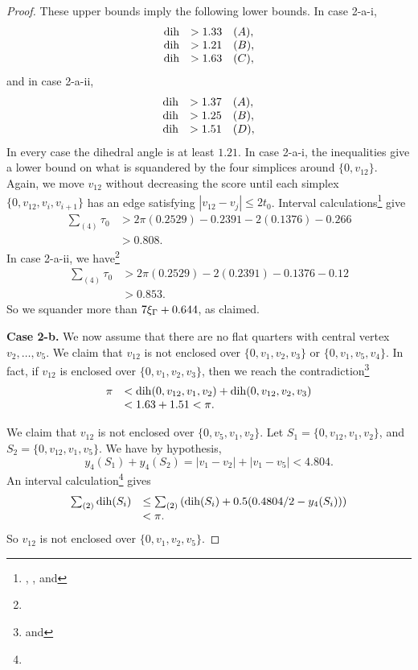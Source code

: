 \begin{proof}
These upper bounds imply the following lower bounds.  In case
2-a-i,
$$
\begin{array}{lll}
\operatorname{dih} &> 1.33 \quad(A),\\
\operatorname{dih} &> 1.21 \quad(B),\\
\operatorname{dih} &> 1.63 \quad(C),\\
\end{array}
$$
and in case 2-a-ii,
$$
\begin{array}{lll}
\operatorname{dih} &> 1.37 \quad(A),\\
\operatorname{dih} &> 1.25 \quad(B),\\
\operatorname{dih} &> 1.51 \quad(D),\\
\end{array}
$$
In every case the dihedral angle is at least $1.21$. In case
2-a-i, the inequalities give a lower bound on what is squandered
by the four simplices around $\{0,v_{12}\}$. Again, we move $v_{12}$
without decreasing the score until each simplex
$\{0,v_{12},v_i,v_{i+1}\}$ has an edge satisfying
$|v_{12}-v_j|\le2t_0$. Interval
calculations\footnote{, , and
} give
    $$
    \begin{array}{lll}
    \sum_{(4)}\tau_0 &> 2\pi (0.2529) - 0.2391-2(0.1376)-0.266\\
        &>0.808.
    \end{array}
    $$
In case 2-a-ii, we have\footnote{}
    $$
    \begin{array}{lll}
    \sum_{(4)}\tau_0 &> 2\pi (0.2529) - 2(0.2391)-0.1376-0.12\\
        &>0.853.
    \end{array}
    $$
So we squander more than $7\xi_\Gamma+0.644$, as claimed.

{\bf Case 2-b.}  We now assume that there are no flat quarters
with central vertex $v_2,\ldots,v_5$. We claim
 that $v_{12}$ is not enclosed over $\{0,v_1,v_2,v_3\}$ or
$\{0,v_1,v_5,v_4\}$. In fact, if $v_{12}$ is enclosed over
$\{0,v_1,v_2,v_3\}$, then we reach the
contradiction\footnote{ and }
    $$
    \begin{array}{lll}
    \pi&<\operatorname{dih}(0,v_{12},v_1,v_2)+\operatorname{dih}(0,v_{12},v_2,v_3)\\
        &< 1.63+1.51 < \pi.
    \end{array}
    $$

We claim
 that $v_{12}$ is not enclosed over $\{0,v_5,v_1,v_2\}$.
Let $S_1=\{0,v_{12},v_1,v_2\}$, and $S_2=\{0,v_{12},v_1,v_5\}$.  We
have by hypothesis,
$$y_4(S_1)+y_4(S_2) = |v_1-v_2|+|v_1-v_5|< 4.804.$$
An interval calculation\footnote{} gives
    $$
    \begin{array}{lll}
    \sum_{(2)}\operatorname{dih}(S_i) &\le \sum_{(2)}
    \left(\operatorname{dih}(S_i)+0.5(0.4804/2-y_4(S_i))\right)\\
    &<\pi.
    \end{array}
    $$
So $v_{12}$ is not enclosed over $\{0,v_1,v_2,v_5\}$.


\end{proof}
